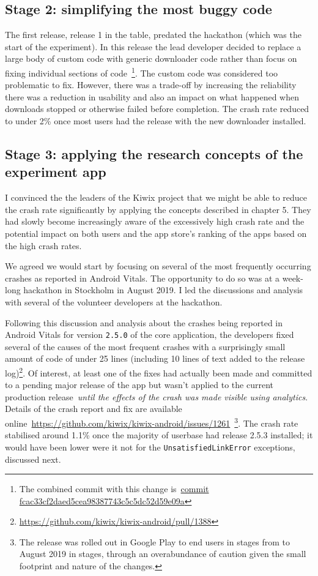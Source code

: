 \subsection{Stage 2: simplifying the most buggy code}
The first release, release 1 in the table, predated the hackathon (which was the start of the experiment). In this release the lead developer decided to replace a large body of custom code with generic downloader code rather than focus on fixing individual sections of code~\footnote{The combined commit with this change is~\href{https://github.com/kiwix/kiwix-android/commit/fcac33cf2daed5cea98387743c5c5dc52d59e09a}{commit fcac33cf2daed5cea98387743c5c5dc52d59e09a}}. The custom code was considered too problematic to fix. However, there was a trade-off by increasing the reliability there was a reduction in usability and also an impact on what happened when downloads stopped or otherwise failed before completion. The crash rate reduced to under 2\% once most users had the release with the new downloader installed.

\subsection{Stage 3: applying the research concepts of the experiment app}
I convinced the the leaders of the Kiwix project that we might be able to reduce the crash rate significantly by applying the concepts described in chapter 5. They had slowly become increasingly aware of the excessively high crash rate and the potential impact on both users and the app store's ranking of the apps based on the high crash rates. 

We agreed we would start by focusing on several of the most frequently occurring crashes as reported in Android Vitals. The opportunity to do so was at a week-long hackathon in Stockholm in August 2019. I led the discussions and analysis with several of the volunteer developers at the hackathon.

Following this discussion and analysis about the crashes being reported in Android Vitals for version \texttt{2.5.0} of the core application, the developers fixed several of the causes of the most frequent crashes with a surprisingly small amount of code of under 25 lines (including 10 lines of text added to the release log)\footnote{\url{https://github.com/kiwix/kiwix-android/pull/1388}}. Of interest, at least one of the fixes had actually been made and committed to a pending major release of the app but wasn't applied to the current production release~\emph{until the effects of the crash was made visible using analytics}. Details of the crash report and fix are available online~\url{https://github.com/kiwix/kiwix-android/issues/1261}~\footnote{The release was rolled out in Google Play to end users in stages from  to  August 2019 in stages, through an overabundance of caution given the small footprint and nature of the changes.}. The crash rate stabilised around 1.1\% once the majority of userbase had release 2.5.3 installed; it would have been lower were it not for the \texttt{UnsatisfiedLinkError} exceptions, discussed next.

